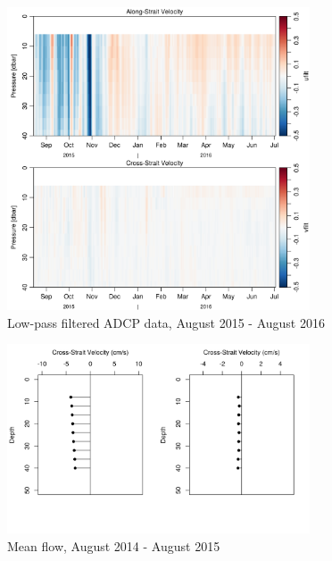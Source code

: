\documentclass[12pt]{dforeport}
\begin{document}
\begin{figure}  
\centering
\includegraphics[width = 0.8\textwidth]{./figures/18_madcp_lpf_2015_2016.png}
\caption[Low-pass filtered ADCP data, 2015-2016]{Low-pass filtered ADCP data, August 2015 - August 2016}
\label{f:madcp_lpf_2015_2016}
\end{figure}



\pagebreak
\newpage

\begin{figure}  
\centering
\includegraphics[width = 0.8\textwidth]{./figures/36_amf_2014_2015.png}
\caption[Mean flow, 2014-2015]{Mean flow, August 2014 - August 2015}
\label{f:amf_2014_2015}
\end{figure}
\end{document}
